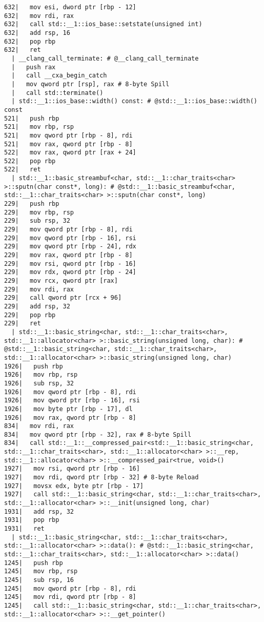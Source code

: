 \begin{lstlisting}[language={},numbers=none,title=\href{https://godbolt.org/z/hwKje8}{\texttt{godbolt.org/z/hwKje8}}]
632|   mov esi, dword ptr [rbp - 12]
632|   mov rdi, rax
632|   call std::__1::ios_base::setstate(unsigned int)
632|   add rsp, 16
632|   pop rbp
632|   ret
  | __clang_call_terminate: # @__clang_call_terminate
  |   push rax
  |   call __cxa_begin_catch
  |   mov qword ptr [rsp], rax # 8-byte Spill
  |   call std::terminate()
  | std::__1::ios_base::width() const: # @std::__1::ios_base::width() const
521|   push rbp
521|   mov rbp, rsp
521|   mov qword ptr [rbp - 8], rdi
521|   mov rax, qword ptr [rbp - 8]
522|   mov rax, qword ptr [rax + 24]
522|   pop rbp
522|   ret
  | std::__1::basic_streambuf<char, std::__1::char_traits<char> >::sputn(char const*, long): # @std::__1::basic_streambuf<char, std::__1::char_traits<char> >::sputn(char const*, long)
229|   push rbp
229|   mov rbp, rsp
229|   sub rsp, 32
229|   mov qword ptr [rbp - 8], rdi
229|   mov qword ptr [rbp - 16], rsi
229|   mov qword ptr [rbp - 24], rdx
229|   mov rax, qword ptr [rbp - 8]
229|   mov rsi, qword ptr [rbp - 16]
229|   mov rdx, qword ptr [rbp - 24]
229|   mov rcx, qword ptr [rax]
229|   mov rdi, rax
229|   call qword ptr [rcx + 96]
229|   add rsp, 32
229|   pop rbp
229|   ret
  | std::__1::basic_string<char, std::__1::char_traits<char>, std::__1::allocator<char> >::basic_string(unsigned long, char): # @std::__1::basic_string<char, std::__1::char_traits<char>, std::__1::allocator<char> >::basic_string(unsigned long, char)
1926|   push rbp
1926|   mov rbp, rsp
1926|   sub rsp, 32
1926|   mov qword ptr [rbp - 8], rdi
1926|   mov qword ptr [rbp - 16], rsi
1926|   mov byte ptr [rbp - 17], dl
1926|   mov rax, qword ptr [rbp - 8]
834|   mov rdi, rax
834|   mov qword ptr [rbp - 32], rax # 8-byte Spill
834|   call std::__1::__compressed_pair<std::__1::basic_string<char, std::__1::char_traits<char>, std::__1::allocator<char> >::__rep, std::__1::allocator<char> >::__compressed_pair<true, void>()
1927|   mov rsi, qword ptr [rbp - 16]
1927|   mov rdi, qword ptr [rbp - 32] # 8-byte Reload
1927|   movsx edx, byte ptr [rbp - 17]
1927|   call std::__1::basic_string<char, std::__1::char_traits<char>, std::__1::allocator<char> >::__init(unsigned long, char)
1931|   add rsp, 32
1931|   pop rbp
1931|   ret
  | std::__1::basic_string<char, std::__1::char_traits<char>, std::__1::allocator<char> >::data(): # @std::__1::basic_string<char, std::__1::char_traits<char>, std::__1::allocator<char> >::data()
1245|   push rbp
1245|   mov rbp, rsp
1245|   sub rsp, 16
1245|   mov qword ptr [rbp - 8], rdi
1245|   mov rdi, qword ptr [rbp - 8]
1245|   call std::__1::basic_string<char, std::__1::char_traits<char>, std::__1::allocator<char> >::__get_pointer()

\end{lstlisting}

